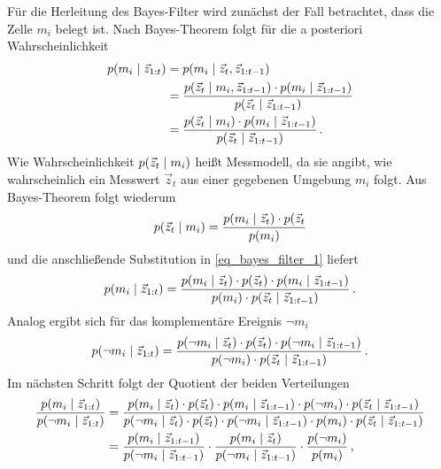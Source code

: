 Für die Herleitung des Bayes-Filter wird zunächst der Fall betrachtet, dass die Zelle $m_i$ belegt ist. Nach Bayes-Theorem folgt für die a posteriori Wahrscheinlichkeit
\begin{equation}
\label{eq_bayes_filter_1}
\begin{split}
p({m_i} \hspace{1mm} \vert \hspace{1mm} {\vec{z}_{1:t}}) &= p({m_i} \hspace{1mm} \vert \hspace{1mm} {\vec{z}_t, \vec{z}_{1:t-1}}) \\
&= \frac{p({\vec{z}_t} \hspace{1mm} \vert \hspace{1mm} {m_i, \vec{z}_{1:t-1}})\cdot p({m_i} \hspace{1mm} \vert \hspace{1mm} {\vec{z}_{1:t-1}})}{p({\vec{z}_t} \hspace{1mm} \vert \hspace{1mm} {\vec{z}_{1:t-1}})} \\
&= \frac{p({\vec{z}_t} \hspace{1mm} \vert \hspace{1mm} {m_i})\cdot p({m_i} \hspace{1mm} \vert \hspace{1mm} {\vec{z}_{1:t-1}})}{p({\vec{z}_t} \hspace{1mm} \vert \hspace{1mm} {\vec{z}_{1:t-1}})}\,.
\end{split}
\end{equation}
Wie Wahrscheinlichkeit $p({\vec{z}_t} \hspace{1mm} \vert \hspace{1mm} {m_i})$ heißt Messmodell, da sie angibt, wie wahrscheinlich ein Messwert $\vec{z}_t$ aus einer gegebenen Umgebung $m_i$ folgt. Aus Bayes-Theorem folgt wiederum
\begin{equation}
p({\vec{z}_t} \hspace{1mm} \vert \hspace{1mm} {m_i}) = \frac{p({m_i} \hspace{1mm} \vert \hspace{1mm} {\vec{z}_t})\cdot p(\vec{z}_t}{p(m_i)}
\end{equation}
und die anschließende Substitution in \ref{eq_bayes_filter_1} liefert
\begin{equation}
p({m_i} \hspace{1mm} \vert \hspace{1mm} {\vec{z}_{1:t}}) = \frac{p({m_i} \hspace{1mm} \vert \hspace{1mm} {\vec{z}_t})\cdot p(\vec{z}_t) \cdot p({m_i} \hspace{1mm} \vert \hspace{1mm} {\vec{z}_{1:t-1}})}{p(m_i)\cdot p({\vec{z}_t} \hspace{1mm} \vert \hspace{1mm} {\vec{z}_{1:t-1}})}\,.
\end{equation}
Analog ergibt sich für das komplementäre Ereignis $\neg m_i$
\begin{equation}
p({\neg m_i} \hspace{1mm} \vert \hspace{1mm} {\vec{z}_{1:t}}) = \frac{p({\neg m_i} \hspace{1mm} \vert \hspace{1mm} {\vec{z}_t})\cdot p(\vec{z}_t) \cdot p({\neg m_i} \hspace{1mm} \vert \hspace{1mm} {\vec{z}_{1:t-1}})}{p(\neg m_i)\cdot p({\vec{z}_t} \hspace{1mm} \vert \hspace{1mm} {\vec{z}_{1:t-1}})}\,.
\end{equation}
Im nächsten Schritt folgt der Quotient der beiden Verteilungen
\begin{equation}
\begin{split}
\frac{p({m_i} \hspace{1mm} \vert \hspace{1mm} {\vec{z}_{1:t}})}{p({\neg m_i} \hspace{1mm} \vert \hspace{1mm} {\vec{z}_{1:t}})} &= \frac{p({m_i} \hspace{1mm} \vert \hspace{1mm} {\vec{z}_t})\cdot p(\vec{z}_t) \cdot p({m_i} \hspace{1mm} \vert \hspace{1mm} {\vec{z}_{1:t-1}}) \cdot p(\neg m_i)\cdot p({\vec{z}_t} \hspace{1mm} \vert \hspace{1mm} {\vec{z}_{1:t-1}})}{p({\neg m_i} \hspace{1mm} \vert \hspace{1mm} {\vec{z}_t})\cdot p(\vec{z}_t) \cdot p({\neg m_i} \hspace{1mm} \vert \hspace{1mm} {\vec{z}_{1:t-1}}) \cdot p(m_i)\cdot p({\vec{z}_t} \hspace{1mm} \vert \hspace{1mm} {\vec{z}_{1:t-1}})} \\
&= \frac{p({m_i} \hspace{1mm} \vert \hspace{1mm} {\vec{z}_{1:t-1}})}{p({\neg m_i} \hspace{1mm} \vert \hspace{1mm} {\vec{z}_{1:t-1}})} \cdot
\frac{p({m_i} \hspace{1mm} \vert \hspace{1mm} {\vec{z}_t})}{p({\neg m_i} \hspace{1mm} \vert \hspace{1mm} {\vec{z}_{1:t-1}})}\cdot \frac{p(\neg m_i)}{p(m_i)}\,,
\end{split}
\end{equation}
